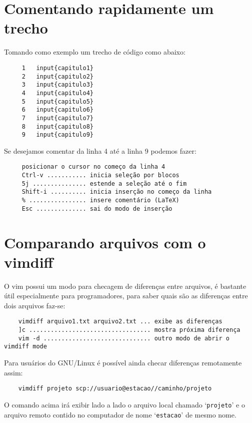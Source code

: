 \section{Comentando rapidamente um trecho}

Tomando como exemplo um trecho de código como abaixo:

\begin{verbatim}
     1   input{capitulo1}
     2   input{capitulo2}
     3   input{capitulo3}
     4   input{capitulo4}
     5   input{capitulo5}
     6   input{capitulo6}
     7   input{capitulo7}
     8   input{capitulo8}
     9   input{capitulo9}
\end{verbatim}

Se desejamos comentar da linha 4 até a linha 9 podemos fazer:

\begin{verbatim}
     posicionar o cursor no começo da linha 4
     Ctrl-v ........... inicia seleção por blocos
     5j ............... estende a seleção até o fim
     Shift-i .......... inicia inserção no começo da linha
     % ................ insere comentário (LaTeX)
     Esc .............. sai do modo de inserção
\end{verbatim}

\section{Comparando arquivos com o vimdiff}
\label{sec:Comparando arquivos com o vimdiff}


O vim possui um modo para checagem de diferenças entre arquivos, é bastante
útil especialmente para programadores, para saber quais
são as diferenças entre dois arquivos faz-se:

\begin{verbatim}
    vimdiff arquivo1.txt arquivo2.txt ... exibe as diferenças
    ]c .................................. mostra próxima diferença
    vim -d .............................. outro modo de abrir o vimdiff mode
\end{verbatim}

Para usuários do GNU/Linux é possível ainda checar diferenças remotamente assim:

\begin{verbatim}
    vimdiff projeto scp://usuario@estacao//caminho/projeto
\end{verbatim}

O comando acima irá exibir lado a lado o arquivo local chamado `{\tt projeto}' e o 
arquivo remoto contido no computador de nome `{\tt estacao}' de mesmo nome.


